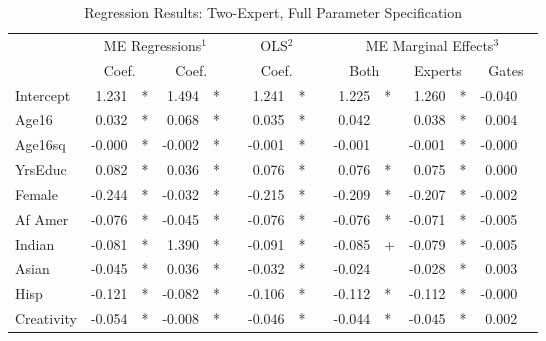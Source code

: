 \documentclass[12pt]{article}
\begin{document}
\begin{landscape}
\begin{table} \centering
  \caption{Regression Results: Two-Expert, Full Parameter Specification}
    \begin{threeparttable}
      \begin{tabular}[l]{l r l r l c r l c r l r l r l}

\cmidrule{1-15}
& \multicolumn{4}{c}{ME Regressions$^{1}$} &&  \multicolumn{2}{c}{OLS$^{2}$} && \multicolumn{6}{c}{ME Marginal Effects$^{3}$} \\
\cmidrule(l){2-5}    \cmidrule(l){7-8}     \cmidrule(l){10-15}
& \multicolumn{2}{c}{Coef.} &  \multicolumn{2}{c}{Coef.}  && \multicolumn{2}{c}{Coef.} && \multicolumn{2}{c}{Both}    &  \multicolumn{2}{c}{Experts}  &  \multicolumn{2}{c}{Gates} \\
                \cmidrule(l){2-3} \cmidrule(l){4-5} \cmidrule(l){7-8} \cmidrule(l){10-11} \cmidrule(l){12-13} \cmidrule(l){14-15}
Intercept     &  1.231 & *      &  1.494 & *     &&  1.241 & *     &&  1.225 & *        &  1.260 & *        & -0.040 &        \\
Age16           &  0.032 & *      &  0.068 & *     &&  0.035 & *     &&  0.042 &          &  0.038 & *        &  0.004 &        \\
Age16sq         & -0.000 & *      & -0.002 & *     && -0.001 & *     && -0.001 &          & -0.001 & *        & -0.000 &        \\
YrsEduc         &  0.082 & *      &  0.036 & *     &&  0.076 & *     &&  0.076 & *        &  0.075 & *        &  0.000 &        \\
Female          & -0.244 & *      & -0.032 & *     && -0.215 & *     && -0.209 & *        & -0.207 & *        & -0.002 &        \\
Af Amer         & -0.076 & *      & -0.045 & *     && -0.076 & *     && -0.076 & *        & -0.071 & *        & -0.005 &        \\
Indian          & -0.081 & *      &  1.390 & *     && -0.091 & *     && -0.085 & +        & -0.079 & *        & -0.005 &        \\
Asian           & -0.045 & *      &  0.036 & *     && -0.032 & *     && -0.024 &          & -0.028 & *        &  0.003 &        \\
Hisp            & -0.121 & *      & -0.082 & *     && -0.106 & *     && -0.112 & *        & -0.112 & *        & -0.000 &        \\
Creativity      & -0.054 & *      & -0.008 & *     && -0.046 & *     && -0.044 & *        & -0.045 & *        &  0.002 &        \\

\end{tabular}
\end{threeparttable}
\end{table}
\end{landscape}
\end{document}
